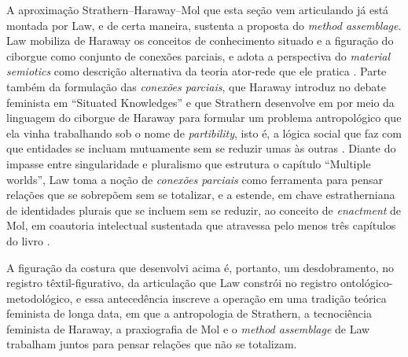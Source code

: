 A aproximação Strathern--Haraway--Mol que esta seção vem articulando já está montada por Law, e de certa maneira, sustenta a proposta do \textit{method assemblage}. Law mobiliza de Haraway os conceitos de conhecimento situado e a figuração do ciborgue como conjunto de conexões parciais, e adota a perspectiva do \textit{material semiotics} como descrição alternativa da teoria ator-rede que ele pratica \parencite[pp.~67--84, e glossário, pp.~159--160]{Law2004After}. Parte também da formulação das \textit{conexões parciais}, que Haraway introduz no debate feminista em \enquote{Situated Knowledges} \parencite{Haraway1991Situated} e que Strathern desenvolve em \textcite{strathern2005partial} por meio da linguagem do ciborgue de Haraway para formular um problema antropológico que ela vinha trabalhando sob o nome de \textit{partibility}, isto é, a lógica social que faz com que entidades se incluam mutuamente sem se reduzir umas às outras \parencite[pp.~xxix, 35--38]{strathern2005partial}. Diante do impasse entre singularidade e pluralismo que estrutura o capítulo \enquote{Multiple worlds}, Law toma a noção de \textit{conexões parciais} como ferramenta para pensar relações que se sobrepõem sem se totalizar, e a estende, em chave estratherniana de identidades plurais que se incluem sem se reduzir, ao conceito de \textit{enactment} de Mol, em coautoria intelectual sustentada que atravessa pelo menos três capítulos do livro \parencite[caps.~3, 4 e 8]{Law2004After}.

A figuração da costura que desenvolvi acima é, portanto, um desdobramento, no registro têxtil-figurativo, da articulação que Law constrói no registro ontológico-metodológico, e essa antecedência inscreve a operação em uma tradição teórica feminista de longa data, em que a antropologia de Strathern, a tecnociência feminista de Haraway, a praxiografia de Mol e o \textit{method assemblage} de Law trabalham juntos para pensar relações que não se totalizam.

